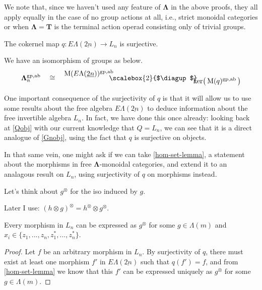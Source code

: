 \documentclass{amsbook} %
\newcommand{\mb}{\mathbf}
\newcommand{\ML}{\mathbf{\Lambda}}
\newcommand{\MLn}{\mathbf{\Lambda}_n}
\newcommand{\bigquotient}[2]{ \raisebox{0.75\height}{$#1$} \mkern-12mu\scalebox{2}{$\diagup$}\mkern-10mu \raisebox{-0.5\height}{$#2$} }
\newcommand{\EL}{E\Lambda}
\newcommand{\ELnn}{E\Lambda(\underline{2n})}
\numberwithin{section}{chapter}
\begin{document}
\begin{rem}\label{alsowithoutgroups}
We note that, since we haven't used any feature of $\ML$ in the above proofs, they all apply equally in the case of no group actions at all, i.e., strict monoidal categories or when $\ML = \mb{T}$ is the terminal action operad consisting only of trivial groups.
\end{rem}

\begin{cor}\label{qsurj} The cokernel map $q: \EL(\underline{2n}) \to L_n$ is surjective.
\end{cor}

\begin{cor}\label{M_coker}
We have an isomorphism of groups as below.
\[ \MLn^{\mathrm{gp},\mathrm{ab}} \quad \cong \quad \bigquotient{\mathrm{M}(\ELnn)^{\mathrm{gp},\mathrm{ab}}}{\mathrm{ker}\big( \, \mathrm{M}(q)^{\mathrm{gp},\mathrm{ab}} \, \big)} \]
\end{cor}

One important consequence of the surjectivity of $q$ is that it will allow us to use some results about the free algebra $\ELnn$ to deduce information about the free invertible algebra $L_n$. In fact, we have done this once already: looking back at \cref{Qobj} with our current knowledge that $Q = L_n$, we can see that it is a direct analogue of \cref{Gnobj}, using the fact that $q$ is surjective on objects. 

In that same vein, one might ask if we can take \cref{hom-set-lemma}, a statement about the morphisms in free $\ML$-monoidal categories, and extend it to an analagous result on $L_n$, using surjectivity of $q$ on morphisms instead. 

\begin{nota}\label{newaction}
Let's think about $g^{\otimes}$ for the iso induced by $g$.
\end{nota}

\begin{lem}\label{otimesotimes}
Later I use: $(h \otimes g)^{\otimes} = h^{\otimes} \otimes g^{\otimes}$.
\end{lem}

\begin{prop} \label{allmapsaction} Every morphism in $L_n$ can be expressed as $g^{\otimes}$
for some $g \in \Lambda(m)$ and $x_i \in \{z_1, ..., z_n, z_1^*, ..., z_n^* \}$.
\end{prop}

\begin{proof}
Let $f$ be an arbitrary morphism in $L_n$. By surjectivity of $q$, there must exist at least one morphism $f'$ in $\ELnn$ such that $q(f') = f$, and from \cref{hom-set-lemma} we know that this $f'$ can be expressed uniquely as $g^{\otimes}$ for some $g \in \Lambda(m)$. 
\end{proof}
\end{document}
